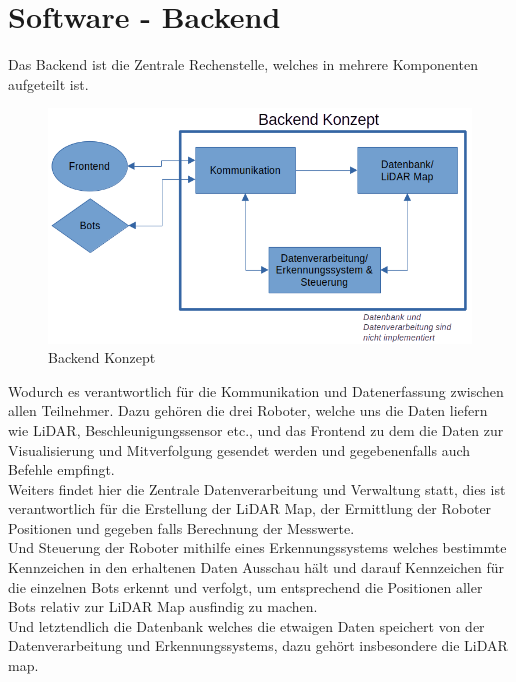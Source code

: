 

\chapter{Software - Backend}
\label{sec:software_backend}
Das Backend ist die Zentrale Rechenstelle, 
welches in mehrere Komponenten aufgeteilt ist.

\begin{figure}[H]
    \includegraphics[width=\textwidth, center]{img/backend-konzept.png}
    \caption{Backend Konzept}
    \label{fig:backend_konzept}
\end{figure}

Wodurch es verantwortlich für die Kommunikation und Datenerfassung 
zwischen allen Teilnehmer. 
Dazu gehören die drei Roboter, welche uns die Daten liefern 
wie LiDAR, Beschleunigungssensor etc., 
und das Frontend zu dem die Daten zur Visualisierung und Mitverfolgung gesendet werden
und gegebenenfalls auch Befehle empfingt.
\\
Weiters findet hier die Zentrale Datenverarbeitung und Verwaltung statt, 
dies ist verantwortlich für die Erstellung der LiDAR Map, 
der Ermittlung der Roboter Positionen 
und gegeben falls Berechnung der Messwerte. 
\\
Und Steuerung der Roboter mithilfe eines Erkennungssystems 
welches bestimmte Kennzeichen in den erhaltenen Daten Ausschau hält und 
darauf Kennzeichen für die einzelnen Bots erkennt und verfolgt, 
um entsprechend die Positionen aller Bots relativ zur LiDAR Map ausfindig zu machen.
% 
\\
Und letztendlich die Datenbank welches die etwaigen Daten speichert 
von der Datenverarbeitung und Erkennungssystems, 
dazu gehört insbesondere die LiDAR map.

